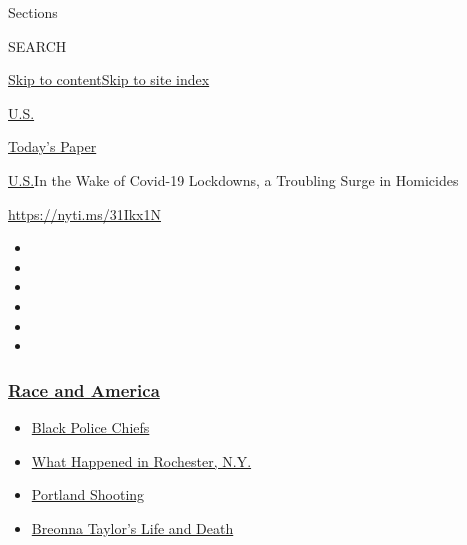 Sections

SEARCH

\protect\hyperlink{site-content}{Skip to
content}\protect\hyperlink{site-index}{Skip to site index}

\href{https://www.nytimes3xbfgragh.onion/section/us}{U.S.}

\href{https://myaccount.nytimes3xbfgragh.onion/auth/login?response_type=cookie\&client_id=vi}{}

\href{https://www.nytimes3xbfgragh.onion/section/todayspaper}{Today's
Paper}

\href{/section/us}{U.S.}\textbar{}In the Wake of Covid-19 Lockdowns, a
Troubling Surge in Homicides

\url{https://nyti.ms/31Ikx1N}

\begin{itemize}
\item
\item
\item
\item
\item
\item
\end{itemize}

\hypertarget{race-and-america}{%
\subsubsection{\texorpdfstring{\href{https://www.nytimes3xbfgragh.onion/news-event/george-floyd-protests-minneapolis-new-york-los-angeles?name=styln-george-floyd\&region=TOP_BANNER\&block=storyline_menu_recirc\&action=click\&pgtype=Article\&impression_id=6c8fa1e0-f52c-11ea-9407-63c7aed3b7c8\&variant=undefined}{Race
and America}}{Race and America}}\label{race-and-america}}

\begin{itemize}
\tightlist
\item
  \href{https://www.nytimes3xbfgragh.onion/2020/09/11/us/black-police-chiefs-reform.html?name=styln-george-floyd\&region=TOP_BANNER\&block=storyline_menu_recirc\&action=click\&pgtype=Article\&impression_id=6c8fa1e1-f52c-11ea-9407-63c7aed3b7c8\&variant=undefined}{Black
  Police Chiefs}
\item
  \href{https://www.nytimes3xbfgragh.onion/2020/09/04/nyregion/rochester-police-daniel-prude.html?name=styln-george-floyd\&region=TOP_BANNER\&block=storyline_menu_recirc\&action=click\&pgtype=Article\&impression_id=6c8fc8f0-f52c-11ea-9407-63c7aed3b7c8\&variant=undefined}{What
  Happened in Rochester, N.Y.}
\item
  \href{https://www.nytimes3xbfgragh.onion/2020/08/30/us/portland-shooting-explained.html?name=styln-george-floyd\&region=TOP_BANNER\&block=storyline_menu_recirc\&action=click\&pgtype=Article\&impression_id=6c8fc8f1-f52c-11ea-9407-63c7aed3b7c8\&variant=undefined}{Portland
  Shooting}
\item
  \href{https://www.nytimes3xbfgragh.onion/2020/08/30/us/breonna-taylor-police-killing.html?name=styln-george-floyd\&region=TOP_BANNER\&block=storyline_menu_recirc\&action=click\&pgtype=Article\&impression_id=6c8fc8f2-f52c-11ea-9407-63c7aed3b7c8\&variant=undefined}{Breonna
  Taylor's Life and Death}
\end{itemize}

